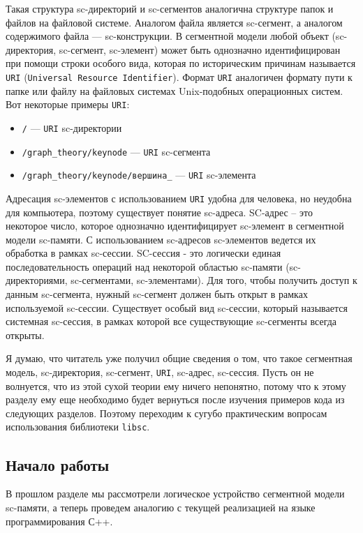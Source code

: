 Такая структура sc-директорий и sc-сегментов аналогична структуре
папок и файлов на файловой системе. Аналогом файла является
sc-сегмент, а аналогом содержимого файла --- sc-конструкции. В
сегментной модели любой объект (sc-директория, sc-сегмент, sc-элемент)
может быть однозначно идентифицирован при помощи строки особого вида,
которая по историческим причинам называется \texttt{URI}
(\texttt{Universal Resource Identifier}). Формат \texttt{URI}
аналогичен формату пути к папке или файлу на файловых системах
Unix-подобных операционных систем. Вот некоторые примеры \texttt{URI}:

\begin{itemize}
\item \verb|/| --- \texttt{URI} sc-директории
\item \verb|/graph_theory/keynode| --- \texttt{URI} sc-сегмента
\item \verb|/graph_theory/keynode/вершина_| --- \texttt{URI}
  sc-элемента
\end{itemize}

Адресация sc-элементов с использованием \texttt{URI} удобна для
человека, но неудобна для компьютера, поэтому существует понятие
sc-адреса. SC-адрес – это некоторое число, которое однозначно
идентифицирует sc-элемент в сегментной модели sc-памяти. С
использованием sc-адресов sc-элементов ведется их обработка в рамках
sc-сессии. SC-сессия - это логически единая последовательность
операций над некоторой областью sc-памяти (sc-директориями,
sc-сегментами, sc-элементами). Для того, чтобы получить доступ к
данным sc-сегмента, нужный sc-сегмент должен быть открыт в рамках
используемой sc-сессии. Существует особый вид sc-сессии, который
называется системная sc-сессия, в рамках которой все существующие
sc-сегменты всегда открыты.

Я думаю, что читатель уже получил общие сведения о том, что такое
сегментная модель, sc-директория, sc-сегмент, \texttt{URI}, sc-адрес,
sc-сессия. Пусть он не волнуется, что из этой сухой теории ему ничего
непонятно, потому что к этому разделу ему еще необходимо будет
вернуться после изучения примеров кода из следующих разделов. Поэтому
переходим к сугубо практическим вопросам использования библиотеки
\texttt{libsc}.

\subsection{Начало работы}
\label{sec:libsc_begin}

В прошлом разделе мы рассмотрели логическое устройство сегментной
модели sc-памяти, а теперь проведем аналогию с текущей реализацией на
языке программирования С++.

